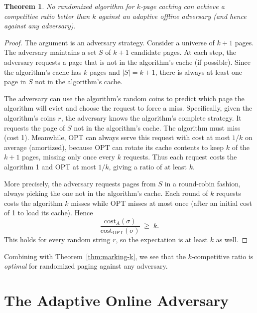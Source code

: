 \documentclass[twoside,12pt]{book}
\theoremstyle{plain}
\newtheorem{theorem}{Theorem}[chapter]
\theoremstyle{definition}
\theoremstyle{remark}
\begin{document}
\begin{theorem}\label{thm:paging-rand-lb}
No randomized algorithm for $k$-page caching can achieve a competitive
ratio better than $k$ against an adaptive offline adversary (and hence
against any adversary).
\end{theorem}

\begin{proof}
The argument is an adversary strategy.  Consider a universe of $k+1$
pages.  The adversary maintains a set $S$ of $k+1$ candidate pages.
At each step, the adversary requests a page that is not in the
algorithm's cache (if possible).  Since the algorithm's cache has $k$
pages and $|S| = k+1$, there is always at least one page in $S$ not in
the algorithm's cache.

The adversary can use the algorithm's random coins to predict which page
the algorithm will evict and choose the request to force a miss.
Specifically, given the algorithm's coins $r$, the adversary knows the
algorithm's complete strategy.  It requests the page of $S$ not in the
algorithm's cache.  The algorithm must miss (cost 1).  Meanwhile, OPT
can always serve this request with cost at most $1/k$ on average
(amortized), because OPT can rotate its cache contents to keep $k$ of
the $k+1$ pages, missing only once every $k$ requests.  Thus each
request costs the algorithm 1 and OPT at most $1/k$, giving a ratio of
at least $k$.

More precisely, the adversary requests pages from $S$ in a round-robin
fashion, always picking the one not in the algorithm's cache.  Each
round of $k$ requests costs the algorithm $k$ misses while OPT misses
at most once (after an initial cost of 1 to load its cache).  Hence
\[
  \frac{\mathrm{cost}_A(\sigma)}{\mathrm{cost}_{\mathrm{OPT}}(\sigma)} \;\ge\; k.
\]
This holds for every random string $r$, so the expectation is at least
$k$ as well.
\end{proof}

Combining with Theorem~\ref{thm:marking-k}, we see that the
$k$-competitive ratio is \emph{optimal} for randomized paging against
any adversary.

\section{The Adaptive Online Adversary}
\label{sec:adaptive-online}
\end{document}
